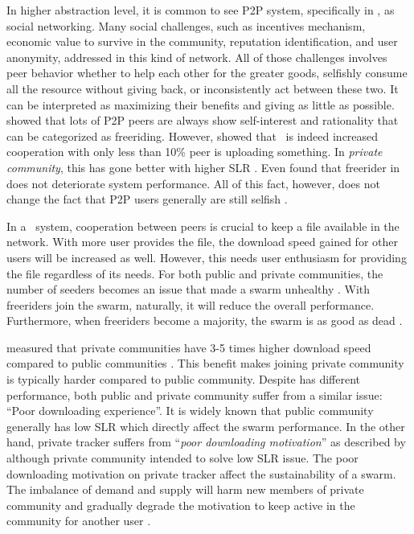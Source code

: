 In higher abstraction level, it is common to see P2P system, specifically in \bt, as social networking. Many social challenges, such as incentives mechanism, economic value to survive in the community, reputation identification, and user anonymity, addressed in this kind of network. All of those challenges involves peer behavior whether to help each other for the greater goods, selfishly consume all the resource without giving back, or inconsistently act between these two. It can be interpreted as maximizing their benefits and giving as little as possible. \citeauthor{2000:freeridegnutella:adar} showed that lots of P2P peers are always show self-interest and rationality \cite{2000:freeridegnutella:adar} that can be categorized as freeriding. However, \citeauthor{2005:bittorrentcooperation:andrade} showed that \bt~is indeed increased cooperation with only less than 10\% peer is uploading something. In \textit{private community}, this has gone better with higher SLR \cite{2005:bittorrentcooperation:andrade}. Even \citeauthor{2015:freeriderinbtcommunity:das} found that freerider in \bt~ does not deteriorate system performance\cite{2015:freeriderinbtcommunity:das}. All of this fact, however, does not change the fact that P2P users generally are still selfish \cite{2014:userbehaviourprivate:jia}. 

In a \bt~system, cooperation between peers is crucial to keep a file available in the network. With more user provides the file, the download speed gained for other users will be increased as well. However, this needs user enthusiasm for providing the file regardless of its needs. For both public and private communities, the number of seeders becomes an issue that made a swarm unhealthy \cite{2010:pubpriv:meulpolder, 2014:sustainabilitytorrent:chen}. With freeriders join the swarm, naturally, it will reduce the overall performance. Furthermore, when freeriders become a majority, the swarm is as good as dead \cite{2000:freeridegnutella:adar}. 

\citeauthor{2010:pubpriv:meulpolder} measured that private communities have 3-5 times higher download speed compared to public communities \cite{2010:pubpriv:meulpolder}. This benefit makes joining private community is typically harder compared to public community. Despite has different performance, both public and private community suffer from a similar issue: ``Poor downloading experience''. It is widely known that public community generally has low SLR which directly affect the swarm performance. In the other hand, private tracker suffers from ``\textit{poor downloading motivation}'' as described by \citeauthor{2014:sustainabilitytorrent:chen}\cite{2014:sustainabilitytorrent:chen} although private community intended to solve low SLR issue. The poor downloading motivation on private tracker affect the sustainability of a swarm. The imbalance of demand and supply will harm new members of private community and gradually degrade the motivation to keep active in the community for another user \cite{2014:sustainabilitytorrent:chen}.

